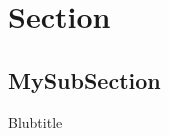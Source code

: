 \documentclass{beamer}
\begin{document}
    \section{Section}
    \subsection{MySubSection}
    \begin{frame}{Blubtitle}
        \inputminted[linenos=true, numbersep=5pt, tabsize=4, fontsize=\small]{java}{IataCode.java}
    \end{frame}
\end{document}
